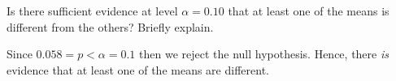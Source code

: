 Is there sufficient evidence at level $\alpha = 0.10$ that at least one of the means is different from the others? Briefly explain.

\soln* Since $0.058 = p < \alpha = 0.1$ then we reject the null hypothesis. Hence, there \textit{is} evidence that at least one of the means are different. 
